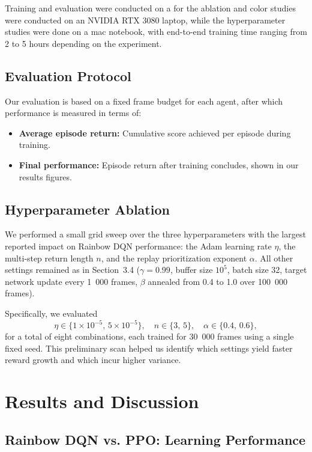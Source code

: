\documentclass{article}
\begin{document}
Training and evaluation were conducted on a for the ablation and color studies were conducted on an NVIDIA RTX 3080 laptop, while the hyperparameter studies were done on a mac notebook, with end-to-end training time ranging from 2 to 5 hours depending on the experiment.

\subsection{Evaluation Protocol}

Our evaluation is based on a fixed frame budget for each agent, after which performance is measured in terms of:

\begin{itemize}
    \item \textbf{Average episode return:} Cumulative score achieved per episode during training.
    \item \textbf{Final performance:} Episode return after training concludes, shown in our results figures.
\end{itemize}

\subsection{Hyperparameter Ablation}
We performed a small grid sweep over the three hyperparameters with the largest reported impact on Rainbow DQN performance: the Adam learning rate \(\eta\), the multi‐step return length \(n\), and the replay prioritization exponent \(\alpha\).  All other settings remained as in Section 3.4 (\(\gamma=0.99\), buffer size \(10^5\), batch size 32, target network update every 1 000 frames, \(\beta\) annealed from 0.4 to 1.0 over 100 000 frames).

Specifically, we evaluated
\[
\eta \in \{1\times10^{-5},\,5\times10^{-5}\},\quad
n \in \{3,\,5\},\quad
\alpha \in \{0.4,\,0.6\},
\]
for a total of eight combinations, each trained for 30 000 frames using a single fixed seed.  This preliminary scan helped us identify which settings yield faster reward growth and which incur higher variance.  


\section{Results and Discussion}

\subsection{Rainbow DQN vs. PPO: Learning Performance}
\end{document}
